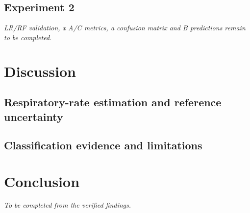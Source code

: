 \FloatBarrier
\section{Experiment 2}
\textit{LR/RF validation, x A/C metrics, a confusion matrix and B predictions remain to be completed.}

\FloatBarrier
\chapter{Discussion}
\section{Respiratory-rate estimation and reference uncertainty}
\section{Classification evidence and limitations}

\chapter{Conclusion}
\textit{To be completed from the verified findings.}
